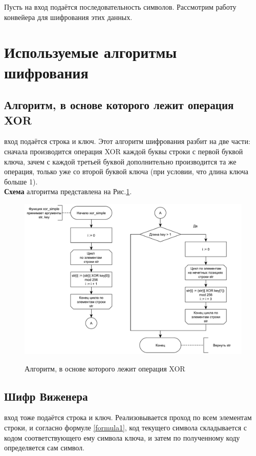Пусть на вход подаётся последовательность символов. Рассмотрим работу конвейера для шифрования этих данных.

\section{Используемые алгоритмы шифрования}

\subsection{Алгоритм, в основе которого лежит операция XOR}
 вход подаётся строка и ключ. Этот алгоритм шифрования разбит на две части: сначала производится операция XOR каждой буквы строки с первой буквой ключа, зачем с каждой третьей буквой дополнительно производится та же операция, только уже со второй буквой ключа (при условии, что длина ключа больше 1).\\

\textbf{Схема} алгоритма представлена на Рис.\ref{fig1:image}.\\
\begin{figure}[h]
	\begin{center}
		{\includegraphics[scale = 0.65]{schemes/xor}}
		\caption{Алгоритм, в основе которого лежит операция XOR}
		\label{fig1:image}
	\end{center}
\end{figure}

\newpage
 
\subsection{Шифр Виженера}
 вход тоже подаётся строка и ключ. Реализовывается проход по всем элементам строки, и согласно формуле \ref{formula1}, код текущего символа складывается с кодом соответствующего ему символа ключа, и затем по полученному коду определяется сам символ.\\

